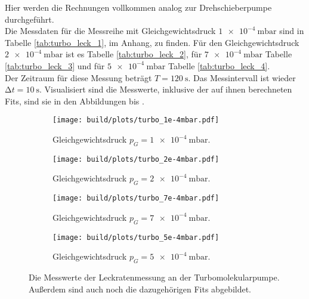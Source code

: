         \noindent
        Hier werden die Rechnungen vollkommen analog zur Drehschieberpumpe durchgeführt.\\
        Die Messdaten für die Messreihe mit Gleichgewichtsdruck $\SI{1e-4}{\milli\bar}$ sind in Tabelle \ref{tab:turbo_leck_1}, im Anhang, zu finden.
        Für den Gleichgewichtsdruck $\SI{2e-4}{\milli\bar}$ ist es Tabelle \ref{tab:turbo_leck_2}, für  $\SI{7e-4}{\milli\bar}$ Tabelle \ref{tab:turbo_leck_3}
        und für $\SI{5e-4}{\milli\bar}$ Tabelle \ref{tab:turbo_leck_4}.\\
        Der Zeitraum für diese Messung beträgt $ T = \SI{120}{\second}$. Das Messintervall ist wieder $ \increment t = \SI{10}{\second}$.
        Visualisiert sind die Messwerte, inklusive der auf ihnen berechneten Fits, sind sie in den Abbildungen  bis .
        \begin{figure}[H]
          \begin{subfigure}{0.46\textwidth}
                  \centering
                  \texttt{[image: build/plots/turbo\_1e-4mbar.pdf]}
                  \caption{Gleichgewichtsdruck $p_G = \SI{1e-4}{\milli\bar}$.}
                  \label{img:turbo_leck_1}
          \end{subfigure}
          \hfill
          \begin{subfigure}{0.46\textwidth}
                  \centering
                  \texttt{[image: build/plots/turbo\_2e-4mbar.pdf]}
                  \caption{Gleichgewichtsdruck $p_G = \SI{2e-4}{\milli\bar}$.}
                  \label{img:turbo_leck_2}
          \end{subfigure}
          \hfill
          \begin{subfigure}{0.46\textwidth}
            \centering
            \texttt{[image: build/plots/turbo\_7e-4mbar.pdf]}
            \caption{Gleichgewichtsdruck $p_G = \SI{7e-4}{\milli\bar}$.}
            \label{img:turbo_leck_3}
          \end{subfigure}
          \hfill
          \begin{subfigure}{0.46\textwidth}
            \centering
            \texttt{[image: build/plots/turbo\_5e-4mbar.pdf]}
            \caption{Gleichgewichtsdruck $p_G = \SI{5e-4}{\milli\bar}$.}
            \label{img:turbo_leck_4}
          \end{subfigure}
          \caption{Die Messwerte der Leckratenmessung an der Turbomolekularpumpe.\\
          Außerdem sind auch noch die dazugehörigen Fits abgebildet. }
      \end{figure}

